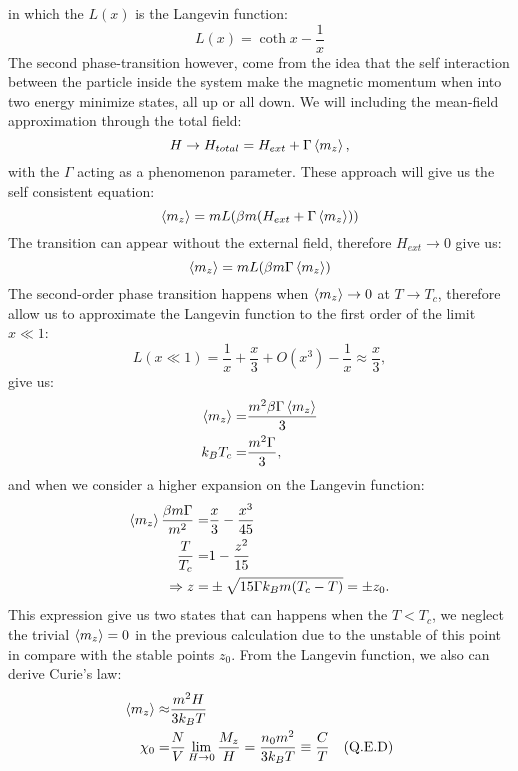 \documentclass[a4paper]{article}
\begin{document}
	in which the \(L(x)\) is the Langevin function:
	\begin{equation}
		L(x) = \coth x - \frac{1}{x}
	\end{equation}
\quad The second phase-transition however, come from the idea that the self interaction between the particle inside the system make the magnetic momentum when into two energy minimize states, all up or all down. We will including the mean-field approximation through the total field:
\begin{equation}
	H \to H_{total}  = H_{ext} + \Gamma \ev{m_z},
\end{equation}
with the \(\Gamma\) acting as a phenomenon parameter. These approach will give us the self consistent equation:
\begin{equation}
	\ev{m_z} = m L(\beta m (H_{ext} + \Gamma \ev{m_z}))
\end{equation}
The transition can appear without the external field, therefore \(H_{ext} \to 0\) give us:
\begin{equation}
	\ev{m_z} = m L(\beta m \Gamma \ev{m_z})
\end{equation}
The second-order phase transition happens when \(\ev{m_z} \to 0\) at \(T \to T_c\), therefore allow us to approximate the Langevin function to the first order of the limit \(x \ll 1\):
\begin{equation}
	L(x\ll 1) = \frac{1}{x} + \frac{x}{3} +O(x^3) - \frac{1}{x} \approx \frac{x}{3},
\end{equation}
give us:
\begin{align}
	\ev{m_z} =& \frac{m^2 \beta \Gamma \ev{m_z}}{3}\nonumber\\
	k_B T_c  =& \frac{m^2 \Gamma}{3},
\end{align}
and when we consider a higher expansion on the Langevin function:
\begin{align}
	\ev{m_z}\frac{\beta m \Gamma}{m^2} =& \frac{x}{3} - \frac{x^3}{45} \nonumber\\
	\frac{T}{T_c} =& 1 - \frac{z^2}{15} \nonumber\\
	\Rightarrow z =& \pm \sqrt{15\Gamma k_B m (T_c-T)} = \pm z_0.
\end{align}
\quad This expression give us two states that can happens when the \(T < T_c\), we neglect the trivial \(\ev{m_z} = 0\) in the previous calculation due to the unstable of this point in compare with the stable points \(z_0\). From the Langevin function, we also can derive Curie's law:
\begin{align}
	\ev{m_z} \approx& \frac{m^2 H}{3 k_B T} \nonumber\\
	\chi_ 0 =& \frac{N}{V} \lim_{H \to 0} \frac{M_z}{H} = \frac{n_0 m^2}{3k_B T} \equiv \frac{C}{T}\quad \text{(Q.E.D)}
\end{align}
\end{document}

